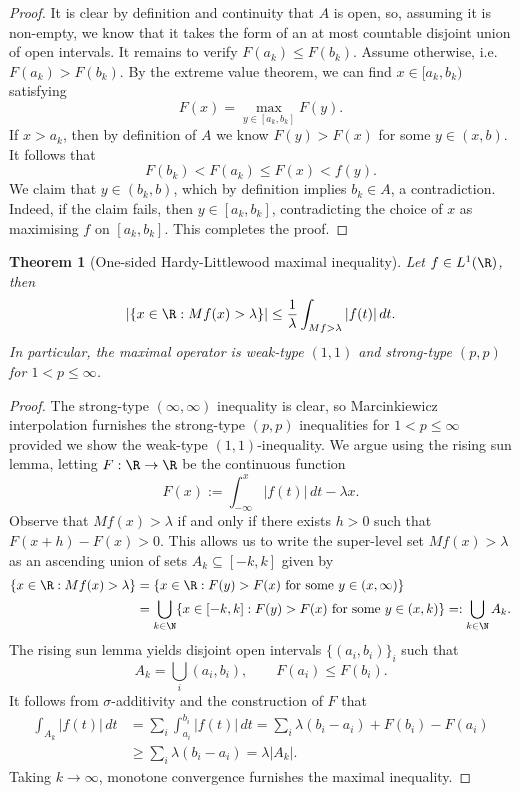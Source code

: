 \documentclass[reqno]{amsart}
\newtheorem{theorem}{Theorem}
\theoremstyle{definition}
\theoremstyle{remark}
\begin{document}
\begin{proof}
	It is clear by definition and continuity that $A$ is open, so, assuming it is non-empty, we know that it takes the form of an at most countable disjoint union of open intervals. It remains to verify $F(a_k) \leq F(b_k)$. Assume otherwise, i.e. $F(a_k) >F(b_k)$. By the extreme value theorem, we can find $x \in [a_k, b_k)$ satisfying
		\[ F(x) = \max_{y \in [a_k, b_k]} F(y). \]
	If $x > a_k$, then by definition of $A$ we know $F(y) > F(x)$ for some $y \in (x, b)$. It follows that
		\[ F(b_k) < F(a_k) \leq F(x) < f(y). \]
	We claim that $y \in (b_k, b)$, which by definition implies $b_k \in A$, a contradiction. Indeed, if the claim fails, then $y \in [a_k, b_k]$, contradicting the choice of $x$ as maximising $f$ on $[a_k, b_k]$. This completes the proof. 
\end{proof}

\begin{theorem}[One-sided Hardy-Littlewood maximal inequality]
	Let $f \in L^1 (\R)$, then 
		\[ |\{ x \in \R : Mf (x) > \lambda \}| \leq \frac1\lambda \int_{Mf > \lambda} |f(t)| \, dt. \]	
	In particular, the maximal operator is weak-type $(1, 1)$ and strong-type $(p, p)$ for $1 < p \leq \infty$.	
\end{theorem}

\begin{proof}
	The strong-type $(\infty, \infty)$ inequality is clear, so Marcinkiewicz interpolation furnishes the strong-type $(p, p)$ inequalities for $1 < p \leq \infty$ provided we show the weak-type $(1, 1)$-inequality. We argue using the rising sun lemma, letting $F: \R \to \R$ be the continuous function
		\[ F(x) := \int_{-\infty}^x |f(t)| \, dt - \lambda x. \]
	Observe that $Mf (x) > \lambda$ if and only if there exists $h > 0$ such that $F(x + h) - F(x) > 0$. This allows us to write the super-level set $Mf(x) > \lambda$ as an ascending union of sets $A_k \subseteq [-k, k]$ given by 
		\begin{align*}
			 \{ x \in \R : Mf(x) > \lambda \} 
			 	&= \{ x \in \R : F(y) > F(x) \text{ for some $y \in (x, \infty)$} \} \\
			 	&= \bigcup_{k \in \N} \{ x \in [-k, k] : F(y) > F(x) \text{ for some $y \in (x, k)$}\} =: \bigcup_{k \in \N} A_k. 
		\end{align*}	 
	The rising sun lemma yields disjoint open intervals $\{ (a_i, b_i) \}_i$ such that 
		\[ A_k = \bigcup_i (a_i, b_i), \qquad F(a_i) \leq F(b_i). \]
	It follows from $\sigma$-additivity and the construction of $F$ that
		\begin{align*}
			 \int_{A_k} |f(t)| \, dt 
			 	&= \sum_i \int_{a_i}^{b_i} |f(t)| \, dt = \sum_i \lambda (b_i - a_i) + F(b_i) - F(a_i) \\
			 	&\geq \sum_i \lambda (b_i - a_i) = \lambda |A_k|. 
		\end{align*}	 		
	Taking $k \to \infty$, monotone convergence furnishes the maximal inequality. 
\end{proof}
\end{document}
